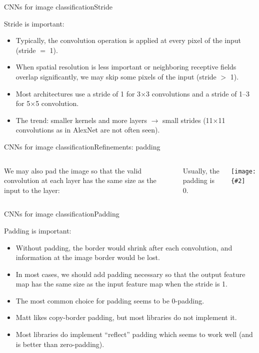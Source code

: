 \documentclass{beamer}
\newcommand{\myfig}[3]{\centerline{\texttt{[image: \{\#2]}}}
\begin{document}
\begin{frame}{CNNs for image classification}{Stride}

  Stride is important:
  \begin{itemize}
  \item Typically, the convolution operation is applied at every pixel
    of the input (stride $=$ 1).
  \item When spatial resolution is less important or neighboring
    receptive fields overlap significantly, we may skip some pixels of
    the input (stride $>$ 1).
  \item Most architectures use a stride of 1 for 3$\times$3
    convolutions and a stride of 1--3 for 5$\times$5 convolution.
  \item The trend: smaller kernels and more layers $\rightarrow$ small
    strides (11$\times$11 convolutions as in AlexNet are not often
    seen).
  \end{itemize}
    
\end{frame}


\begin{frame}{CNNs for image classification}{Refinements: padding}

  \begin{columns}

    \column{1.5in}
    
    We may also \alert{pad} the image so that the valid convolution at
    each layer has the same size as the input to the layer:

    \medskip
    
    Usually, the padding is 0.

    \column{3in}
    
    \myfig{2.5in}{goodfellow-fig9-13}{Goodfellow et al. (2016), Figure 9.13}

  \end{columns}

\end{frame}


\begin{frame}{CNNs for image classification}{Padding}

  Padding is important:
  \begin{itemize}
  \item Without padding, the border would shrink after each
    convolution, and information at the image border would be lost.
  \item In most cases, we should add padding necessary so that the
    output feature map has the same size as the input feature map when
    the stride is 1.
  \item The most common choice for padding seems to be 0-padding.
  \item Matt likes copy-border padding, but most libraries do not implement it.
  \item Most libraries do implement ``reflect'' padding which seems to
    work well (and is better than zero-padding).
  \end{itemize}
  
\end{frame}
\end{document}
